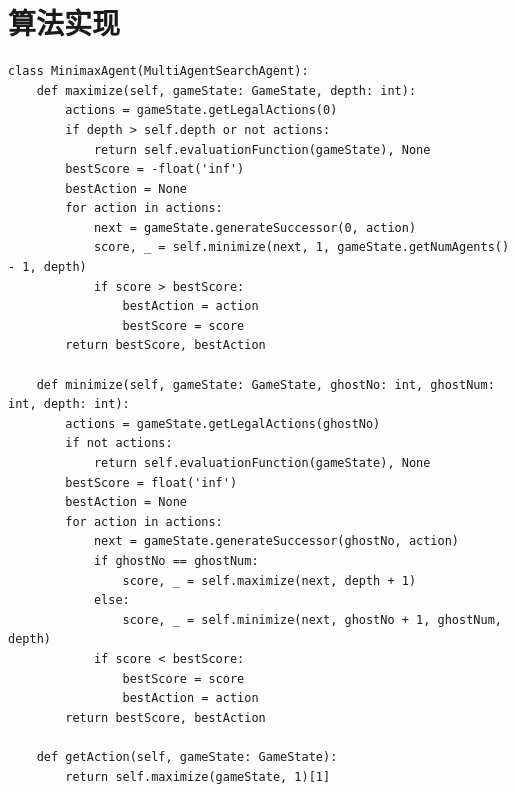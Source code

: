 \section{算法实现}
\begin{lstlisting}[emph={[3]currentGameState,gameState,depth},emphstyle={[3]\color{vscode_parametercolor}},emph={[4]GameState,MinimaxAgent},emphstyle={[4]\color{vscode_classcolor}}]
class MinimaxAgent(MultiAgentSearchAgent):
    def maximize(self, gameState: GameState, depth: int):
        actions = gameState.getLegalActions(0)
        if depth > self.depth or not actions:
            return self.evaluationFunction(gameState), None
        bestScore = -float('inf')
        bestAction = None
        for action in actions:
            next = gameState.generateSuccessor(0, action)
            score, _ = self.minimize(next, 1, gameState.getNumAgents() - 1, depth)
            if score > bestScore:
                bestAction = action
                bestScore = score
        return bestScore, bestAction

    def minimize(self, gameState: GameState, ghostNo: int, ghostNum: int, depth: int):
        actions = gameState.getLegalActions(ghostNo)
        if not actions:
            return self.evaluationFunction(gameState), None
        bestScore = float('inf')
        bestAction = None
        for action in actions:
            next = gameState.generateSuccessor(ghostNo, action)
            if ghostNo == ghostNum:
                score, _ = self.maximize(next, depth + 1)
            else:
                score, _ = self.minimize(next, ghostNo + 1, ghostNum, depth)
            if score < bestScore:
                bestScore = score
                bestAction = action
        return bestScore, bestAction

    def getAction(self, gameState: GameState):
        return self.maximize(gameState, 1)[1]
\end{lstlisting}
